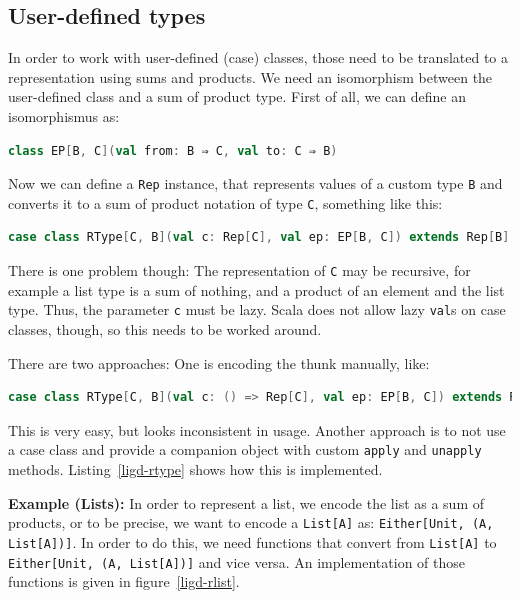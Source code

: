 \documentclass[abstracton,parskip=half]{scrreprt}
\newcommand{\cd}{\texttt}
\begin{document}
    \subsection{User-defined types}
    In order to work with user-defined (case) classes, those need to be
    translated to a representation using sums and products. We need an
    isomorphism between the user-defined class and a sum of product type. First
    of all, we can define an isomorphismus as:
    \begin{lstlisting}[language=scala,gobble=6]
      class EP[B, C](val from: B ⇒ C, val to: C ⇒ B)
    \end{lstlisting}
    Now we can define a \cd{Rep} instance, that represents values of a custom
    type \cd{B} and converts it to a sum of product notation of type \cd{C},
    something like this:
    \begin{lstlisting}[language=scala,gobble=6]
      case class RType[C, B](val c: Rep[C], val ep: EP[B, C]) extends Rep[B]
    \end{lstlisting}
    There is one problem though: The representation of \cd{C} may be recursive,
    for example a list type is a sum of nothing, and a product of an element and
    the list type. Thus, the parameter \cd{c} must be lazy. Scala does not allow
    lazy \cd{val}s on case classes, though, so this needs to be worked around.

    There are two approaches: One is encoding the thunk manually, like:
    \begin{lstlisting}[language=scala,gobble=6]
      case class RType[C, B](val c: () => Rep[C], val ep: EP[B, C]) extends Rep[B]
    \end{lstlisting}
    This is very easy, but looks inconsistent in usage. Another approach is to
    not use a case class and provide a companion object with custom \cd{apply}
    and \cd{unapply} methods. Listing~\ref{ligd-rtype} shows how this is
    implemented.
    

    \textbf{Example (Lists):} In order to represent a list, we encode the
    list as a sum of products, or to be precise, we want to encode a \cd{List[A]}
    as: \cd{Either[Unit, (A, List[A])]}. In order to do this, we need functions
    that convert from \cd{List[A]} to \cd{Either[Unit, (A, List[A])]} and
    vice versa. An implementation of those functions is given in figure~\ref{ligd-rlist}.
\end{document}
